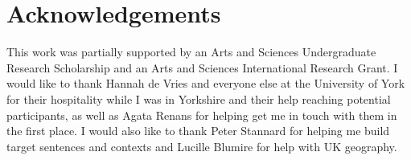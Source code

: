 \documentclass[titlepage,12pt]{article}
\begin{document}




\section{Acknowledgements}

This work was partially supported by an Arts and Sciences Undergraduate Research Scholarship and an Arts and Sciences International Research Grant. I would like to thank Hannah de Vries and everyone else at the University of York for their hospitality while I was in Yorkshire and their help reaching potential participants, as well as Agata Renans for helping get me in touch with them in the first place. I would also like to thank Peter Stannard for helping me build target sentences and contexts and Lucille Blumire for help with UK geography.
\end{document}
